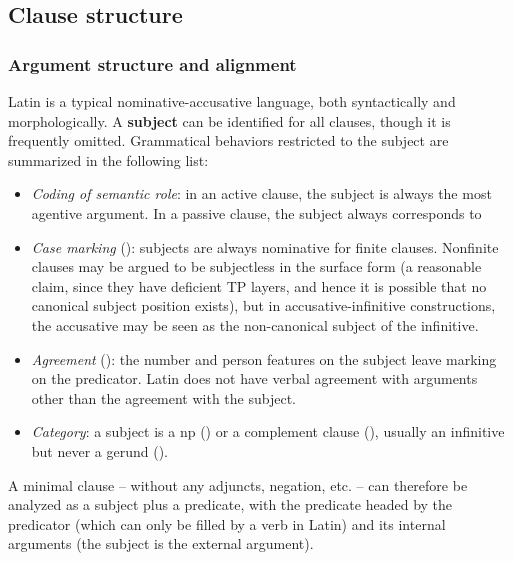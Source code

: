 \documentclass{article}
\newcommand*{\concept}[1]{\textbf{#1}}
\begin{document}
\subsection{Clause structure}\label{sec:clause-structure-abs}

\subsubsection{Argument structure and alignment}\label{sec:alignment-abs}

Latin is a typical nominative-accusative language, both syntactically and morphologically.
A \concept{subject} can be identified for all clauses, though it is frequently omitted.
Grammatical behaviors restricted to the subject are summarized in the following list: 
\begin{itemize}
    \item \emph{Coding of semantic role}: in an active clause, 
    the subject is always the most agentive argument.
    In a passive clause, the subject always corresponds to %
    \item \emph{Case marking} (): 
    subjects are always nominative for finite clauses. 
    Nonfinite clauses may be argued to be subjectless in the surface form 
    (a reasonable claim, since they have deficient TP layers, 
    and hence it is possible that no canonical subject position exists),
    but in accusative-infinitive constructions, %
    the accusative may be seen as the non-canonical subject of the infinitive.
    \item \emph{Agreement} (): 
    the number and person features on the subject leave marking on the predicator.
    Latin does not have verbal agreement with arguments other than the agreement with the subject.
    \item \emph{Category}: a subject is a \ac{np} () 
    or a complement clause (), 
    usually an infinitive but never a gerund ().
\end{itemize}

A minimal clause -- without any adjuncts, negation, etc. -- can therefore be analyzed as 
a subject plus a predicate,
with the predicate headed by the predicator (which can only be filled by a verb in Latin) 
and its internal arguments
(the subject is the external argument).
\end{document}

